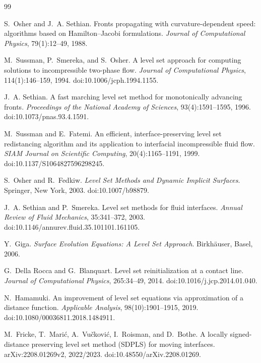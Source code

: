 \documentclass[11pt,a4paper]{article}
\theoremstyle{definition}
\theoremstyle{remark}
\begin{document}
\begin{thebibliography}{99}

S.~Osher and J.~A. Sethian.
\newblock Fronts propagating with curvature-dependent speed: algorithms based on Hamilton--Jacobi formulations.
\newblock \emph{Journal of Computational Physics}, 79(1):12--49, 1988.

M.~Sussman, P.~Smereka, and S.~Osher.
\newblock A level set approach for computing solutions to incompressible two-phase flow.
\newblock \emph{Journal of Computational Physics}, 114(1):146--159, 1994.
\newblock doi:10.1006/jcph.1994.1155.

J.~A. Sethian.
\newblock A fast marching level set method for monotonically advancing fronts.
\newblock \emph{Proceedings of the National Academy of Sciences}, 93(4):1591--1595, 1996.
\newblock doi:10.1073/pnas.93.4.1591.

M.~Sussman and E.~Fatemi.
\newblock An efficient, interface-preserving level set redistancing algorithm and its application to interfacial incompressible fluid flow.
\newblock \emph{SIAM Journal on Scientific Computing}, 20(4):1165--1191, 1999.
\newblock doi:10.1137/S1064827596298245.

S.~Osher and R.~Fedkiw.
\newblock \emph{Level Set Methods and Dynamic Implicit Surfaces}.
\newblock Springer, New York, 2003.
\newblock doi:10.1007/b98879.

J.~A. Sethian and P.~Smereka.
\newblock Level set methods for fluid interfaces.
\newblock \emph{Annual Review of Fluid Mechanics}, 35:341--372, 2003.
\newblock doi:10.1146/annurev.fluid.35.101101.161105.

Y.~Giga.
\newblock \emph{Surface Evolution Equations: A Level Set Approach}.
\newblock Birkh\"auser, Basel, 2006.

G.~Della Rocca and G.~Blanquart.
\newblock Level set reinitialization at a contact line.
\newblock \emph{Journal of Computational Physics}, 265:34--49, 2014.
\newblock doi:10.1016/j.jcp.2014.01.040.

N.~Hamamuki.
\newblock An improvement of level set equations via approximation of a distance function.
\newblock \emph{Applicable Analysis}, 98(10):1901--1915, 2019.
\newblock doi:10.1080/00036811.2018.1484911.

M.~Fricke, T.~Mari\'c, A.~Vu\v{c}kovi\'c, I.~Roisman, and D.~Bothe.
\newblock A locally signed-distance preserving level set method (SDPLS) for moving interfaces.
\newblock arXiv:2208.01269v2, 2022/2023.
\newblock doi:10.48550/arXiv.2208.01269.


\end{thebibliography}
\end{document}
